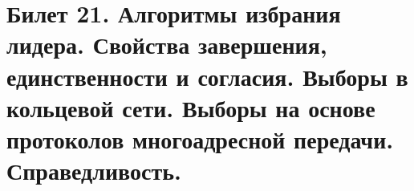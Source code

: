 \newpage
\section {Билет 21. Алгоритмы избрания лидера. Свойства завершения, единственности и согласия. Выборы в кольцевой сети. Выборы на основе протоколов многоадресной передачи. Справедливость.}
